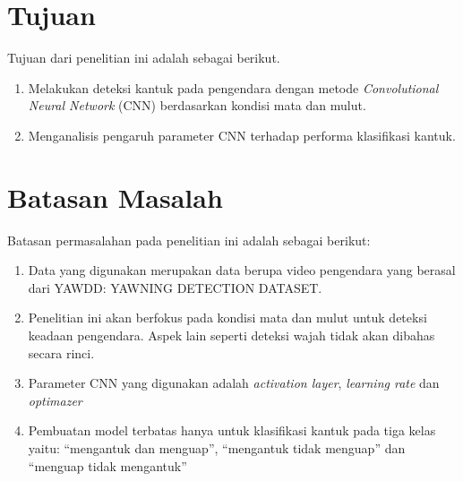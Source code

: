 \section{Tujuan}
Tujuan dari penelitian ini adalah sebagai berikut.

\begin{enumerate}

    \item Melakukan deteksi kantuk pada pengendara dengan metode \textit{Convolutional Neural Network} (CNN) berdasarkan kondisi mata dan mulut.
    
    \item Menganalisis pengaruh parameter CNN terhadap performa klasifikasi kantuk.

\end{enumerate}
\section{Batasan Masalah}
Batasan permasalahan pada penelitian ini adalah sebagai berikut:
\begin{enumerate}

    \item Data yang digunakan merupakan data berupa video pengendara yang berasal dari YAWDD: YAWNING DETECTION DATASET. 
    \item Penelitian ini akan berfokus pada kondisi mata dan mulut untuk deteksi keadaan pengendara. Aspek lain seperti deteksi wajah tidak akan dibahas secara rinci. 
    \item Parameter CNN yang digunakan adalah \textit{activation layer}, \textit{learning rate} dan \textit{optimazer}
    \item Pembuatan model terbatas hanya untuk klasifikasi kantuk pada tiga kelas yaitu: “mengantuk dan menguap”, “mengantuk tidak menguap” dan “menguap tidak mengantuk”

    

\end{enumerate}